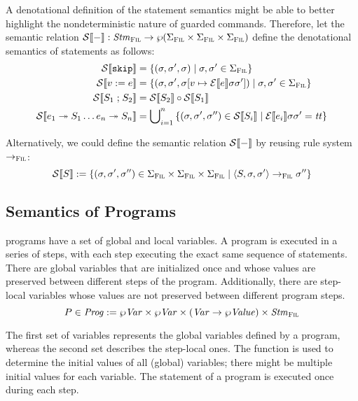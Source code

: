 \documentclass[a4paper,10pt,english]{article}
\begin{document}
A denotational definition of the statement semantics might be able to better highlight the nondeterministic nature of guarded
commands. Therefore, let the semantic relation $\mathcal{S} \llbracket - \rrbracket : \mathit{Stm}_\textsc{Fil} \rightarrow \wp (\Sigma_\textsc{Fil} \times \Sigma_\textsc{Fil} \times
\Sigma_\textsc{Fil})$ define the denotational semantics of statements as follows:
\begin{align*}
	\mathcal{S} \llbracket \mathtt{skip} \rrbracket &= \{ (\sigma, \sigma', \sigma) \mid \sigma, \sigma' \in \Sigma_\textsc{Fil} \}
	\\
	\mathcal{S} \llbracket v\; \mathtt{:=}\; e \rrbracket &= \{ (\sigma, \sigma', \sigma[v \mapsto \mathcal{E} \llbracket e \rrbracket \sigma
	\sigma']) \mid \sigma, \sigma' \in \Sigma_\textsc{Fil} \}
	\\
	\mathcal{S} \llbracket S_1 \; \mathtt{;} \; S_2 \rrbracket &= \mathcal{S} \llbracket S_2 \rrbracket \circ \mathcal{S} \llbracket S_1 \rrbracket
	\\
	\mathcal{S} \llbracket e_1 \; \mathtt{\twoheadrightarrow} \; S_1 \ldots e_n \; \mathtt{\twoheadrightarrow} \; S_n \rrbracket &= 
		\bigcup\nolimits_{i = 1}^n \,
		\{ (\sigma, \sigma', \sigma'') \in \mathcal{S} \llbracket S_i \rrbracket \mid \mathcal{E} \llbracket e_i \rrbracket \sigma \sigma' = \mathit{tt} \}
\end{align*}

Alternatively, we could define the semantic relation $\mathcal{S} \llbracket - \rrbracket$ by reusing rule system $\rightarrow_{\textsc{Fil}}$:
\begin{equation*}
	\mathcal{S} \llbracket S \rrbracket := \{ (\sigma, \sigma', \sigma'') \in \Sigma_\textsc{Fil} \times \Sigma_\textsc{Fil} \times \Sigma_\textsc{Fil} \mid
	\langle S, \sigma, \sigma' \rangle \rightarrow_{\textsc{Fil}} \sigma'' \}
\end{equation*}

\subsection{Semantics of \Fil Programs}

\Fil programs have a set of global and local variables. A \Fil program is executed in a series of steps, with each step executing
the exact same sequence of statements. There are global variables that are initialized once and whose values are preserved between
different steps of the program. Additionally, there are step-local variables whose values are not preserved between different
program steps.
\begin{equation*}
	P \in \mathit{Prog} := \wp \mathit{Var} \times \wp \mathit{Var} \times (\mathit{Var} \rightarrow \wp \mathit{Value}) \times \mathit{Stm}_\textsc{Fil}
\end{equation*}

The first set of variables represents the global variables defined by a program, whereas the second set describes the step-local
ones. The function is used to determine the initial values of all (global) variables; there might be multiple initial
values for each variable. The statement of a program is executed once during each step.
\end{document}
